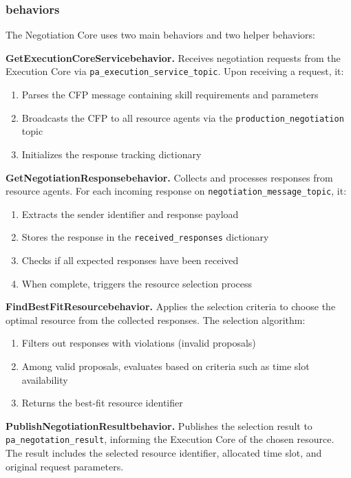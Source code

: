 \subsubsection{behaviors}

The Negotiation Core uses two main behaviors and two helper behaviors:

\textbf{GetExecutionCoreServicebehavior.} Receives negotiation requests from the Execution Core via \texttt{pa\_execution\_service\_topic}. Upon receiving a request, it:
\begin{enumerate}
    \item Parses the CFP message containing skill requirements and parameters
    \item Broadcasts the CFP to all resource agents via the \texttt{production\_negotiation} topic
    \item Initializes the response tracking dictionary
\end{enumerate}

\textbf{GetNegotiationResponsebehavior.} Collects and processes responses from resource agents. For each incoming response on \texttt{negotiation\_message\_topic}, it:
\begin{enumerate}
    \item Extracts the sender identifier and response payload
    \item Stores the response in the \texttt{received\_responses} dictionary
    \item Checks if all expected responses have been received
    \item When complete, triggers the resource selection process
\end{enumerate}

\textbf{FindBestFitResourcebehavior.} Applies the selection criteria to choose the optimal resource from the collected responses. The selection algorithm:
\begin{enumerate}
    \item Filters out responses with violations (invalid proposals)
    \item Among valid proposals, evaluates based on criteria such as time slot availability
    \item Returns the best-fit resource identifier
\end{enumerate}

\textbf{PublishNegotiationResultbehavior.} Publishes the selection result to \texttt{pa\_negotation\_result}, informing the Execution Core of the chosen resource. The result includes the selected resource identifier, allocated time slot, and original request parameters.

